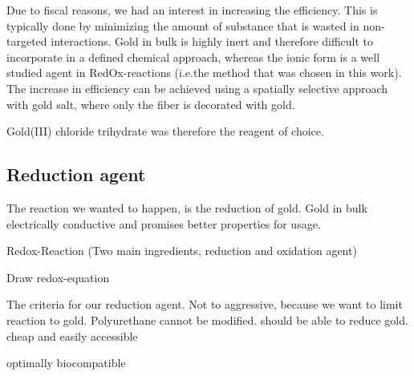 Due to fiscal reasons, we had an interest in increasing the efficiency. This is typically done by minimizing the amount of substance that is wasted in non-targeted interactions. Gold in bulk is highly inert and therefore difficult to incorporate in a defined chemical approach, whereas the ionic form is a well studied agent in RedOx-reactions (i.e.the method that was chosen in this work).  The increase in efficiency can be achieved using a spatially selective approach with gold salt, where only the fiber is decorated with gold.

Gold(III) chloride trihydrate was therefore the reagent of choice.

\subsection{Reduction agent}


The reaction we wanted to happen, is the reduction of gold. Gold in bulk electrically conductive and promises better properties for usage.

Redox-Reaction (Two main ingredients, reduction and oxidation agent)

Draw redox-equation

The criteria for our reduction agent. Not to aggressive, because we want to limit reaction to gold. Polyurethane cannot be modified. should be able to reduce gold. 
cheap and easily accessible

optimally biocompatible



